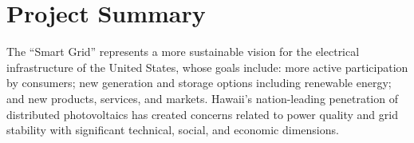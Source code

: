 
\section*{Project Summary}







The ``Smart Grid'' represents a more sustainable vision for the electrical infrastructure of the United States, whose goals include: more active participation by consumers; new generation and storage options including renewable energy; and new products, services, and markets.  Hawaii's nation-leading penetration of distributed photovoltaics has created concerns related to power quality and grid stability with significant technical, social, and economic dimensions.

